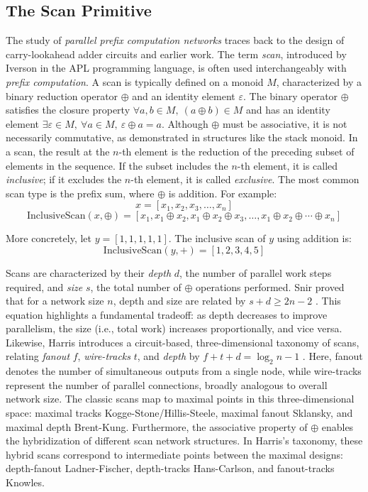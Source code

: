 \documentclass[sigconf]{acmart}
\begin{document}
\subsection{The Scan Primitive}
The study of \emph{parallel prefix computation networks} traces back to the design of carry-lookahead adder circuits and earlier work\cite{10.1145/322217.322232, 5219801}. The term \emph{scan}, introduced by Iverson in the APL programming language, is often used interchangeably with \emph{prefix computation}\cite{IVERSON}. A scan is typically defined on a monoid \( M \), characterized by a binary reduction operator \( \oplus \) and an identity element \( \varepsilon \). The binary operator \( \oplus \) satisfies the closure property \( \forall a, b \in M, \ (a \oplus b) \in M \) and has an identity element \( \exists \varepsilon \in M, \ \forall a \in M, \ \varepsilon \oplus a = a \). Although \( \oplus \) must be associative, it is not necessarily commutative, as demonstrated in structures like the stack monoid\cite{}. In a scan, the result at the \( n \)-th element is the reduction of the preceding subset of elements in the sequence. If the subset includes the \( n \)-th element, it is called \textit{inclusive}; if it excludes the \( n \)-th element, it is called \textit{exclusive}. The most common scan type is the prefix sum, where \( \oplus \) is addition. For example:
\[
x = [x_1, x_2, x_3, \dots, x_n]
\]
\[
\text{InclusiveScan}(x, \oplus) = [x_1, x_1 \oplus x_2, x_1 \oplus x_2 \oplus x_3, \dots, x_1 \oplus x_2 \oplus \cdots \oplus x_n]
\]

More concretely, let \( y = [1, 1, 1, 1, 1] \). The inclusive scan of \( y \) using addition is:
\[
\text{InclusiveScan}(y, +) = [1, 2, 3, 4, 5]
\]
 
 Scans are characterized by their \emph{depth} $d$, the number of parallel work steps required, and \emph{size} $s$, the total number of $\oplus$ operations performed. Snir proved that for a network size $n$, depth and size are related by $s + d \ge 2n - 2$ \cite{}. This equation highlights a fundamental tradeoff: as depth decreases to improve parallelism, the size (i.e., total work) increases proportionally, and vice versa. Likewise, Harris introduces a circuit-based, three-dimensional taxonomy of scans, relating \emph{fanout} $f$, \emph{wire-tracks} $t$, and \emph{depth} by $f + t + d = \log_2n - 1$ \cite{}. Here, fanout denotes the number of simultaneous outputs from a single node, while wire-tracks represent the number of parallel connections, broadly analogous to overall network size. The classic scans map to maximal points in this three-dimensional space: maximal tracks Kogge-Stone/Hillis-Steele\cite{}, maximal fanout Sklansky\cite{}, and maximal depth Brent-Kung\cite{}. Furthermore, the associative property of $\oplus$ enables the hybridization of different scan network structures. In Harris’s taxonomy, these hybrid scans correspond to intermediate points between the maximal designs: depth-fanout Ladner-Fischer\cite{}, depth-tracks Hans-Carlson\cite{}, and fanout-tracks Knowles\cite{}.  
 
\end{document}
